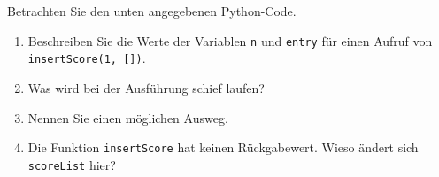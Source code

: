 Betrachten Sie den unten angegebenen Python-Code.
\begin{enumerate}
	\item Beschreiben Sie die Werte der Variablen \verb|n| und \verb|entry| für einen Aufruf von \verb|insertScore(1, [])|.
	\item Was wird bei der Ausführung schief laufen?
	\item Nennen Sie einen möglichen Ausweg.
	\item Die Funktion \verb|insertScore| hat keinen Rückgabewert. Wieso ändert sich \verb|scoreList| hier?
\end{enumerate}

